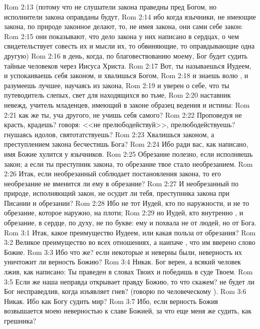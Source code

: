 \vs Rom 2:13 (потому что не слушатели закона праведны пред Богом, но исполнители закона оправданы будут,
\vs Rom 2:14 ибо когда язычники, не имеющие закона, по природе законное делают, то, не имея закона, они сами себе закон:
\vs Rom 2:15 они показывают, что дело закона у них написано в сердцах, о чем свидетельствует совесть их и мысли их, то обвиняющие, то оправдывающие одна другую)
\vs Rom 2:16 в день, когда, по благовествованию моему, Бог будет судить тайные  человеков через Иисуса Христа.
\rsbpar\vs Rom 2:17 Вот, ты называешься Иудеем, и успокаиваешь себя законом, и хвалишься Богом,
\vs Rom 2:18 и знаешь волю , и разумеешь лучшее, научаясь из закона,
\vs Rom 2:19 и уверен о себе, что ты путеводитель слепых, свет для находящихся во тьме,
\vs Rom 2:20 наставник невежд, учитель младенцев, имеющий в законе образец ведения и истины:
\vs Rom 2:21 как же ты, уча другого, не учишь себя самого?
\vs Rom 2:22 Проповедуя не красть, крадешь? говоря: <<не прелюбодействуй>>, прелюбодействуешь? гнушаясь идолов, святотатствуешь?
\vs Rom 2:23 Хвалишься законом, а преступлением закона бесчестишь Бога?
\vs Rom 2:24 Ибо ради вас, как написано, имя Божие хулится у язычников.
\vs Rom 2:25 Обрезание полезно, если исполняешь закон; а если ты преступник закона, то обрезание твое стало необрезанием.
\vs Rom 2:26 Итак, если необрезанный соблюдает постановления закона, то его необрезание не вменится ли ему в обрезание?
\vs Rom 2:27 И необрезанный по природе, исполняющий закон, не осудит ли тебя, преступника закона при Писании и обрезании?
\vs Rom 2:28 Ибо не тот Иудей, кто  по наружности, и не то обрезание, которое наружно, на плоти;
\vs Rom 2:29 но  Иудей, кто внутренно , и  обрезание,  в сердце, по духу,  не по букве: ему и похвала не от людей, но от Бога.
\vs Rom 3:1 Итак, какое преимущество  Иудеем, или какая польза от обрезания?
\vs Rom 3:2 Великое преимущество во всех отношениях, а наипаче , что им вверено слово Божие.
\vs Rom 3:3 Ибо что же? если некоторые и неверны были, неверность их уничтожит ли верность Божию?
\vs Rom 3:4 Никак. Бог верен, а всякий человек лжив, как написано: Ты праведен в словах Твоих и победишь в суде Твоем.
\vs Rom 3:5 Если же наша неправда открывает правду Божию, то что скажем? не будет ли Бог несправедлив, когда изъявляет гнев? (говорю по человеческому ).
\vs Rom 3:6 Никак. Ибо  как Богу судить мир?
\vs Rom 3:7 Ибо, если верность Божия возвышается моею неверностью к славе Божией, за что еще меня же судить, как грешника?
